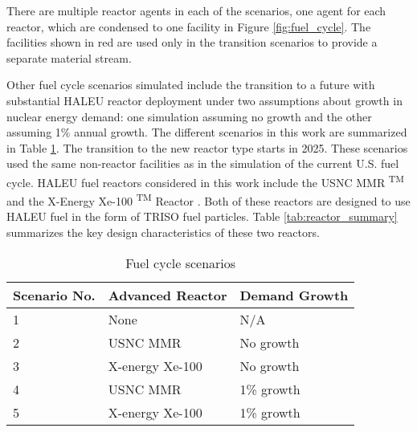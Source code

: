 There are multiple reactor agents in each of the scenarios, one agent for 
each reactor, which are condensed to one facility in Figure 
\ref{fig:fuel_cycle}. The facilities shown in red are used only in the 
transition scenarios to provide a separate material stream. 

Other fuel cycle scenarios simulated include the transition to a future with 
substantial \gls{HALEU} 
reactor deployment under two assumptions about growth in nuclear energy 
demand: one simulation assuming no growth and the other assuming 1\% annual 
growth. The different scenarios in this work are summarized in Table 
\ref{tab:scenarios}.  
The transition to the new reactor type starts in 2025. 
These scenarios used the same  
non-reactor facilities as in the simulation of the current 
U.S. fuel cycle. \gls{HALEU} fuel reactors 
considered in this work include the \gls{USNC} \gls{MMR} \textsuperscript{TM}
\cite{mitchell_usnc_2020} and the X-Energy Xe-100 \textsuperscript{TM} 
Reactor \cite{harlan_x-energy_2018}\cite{hussain_advances_2018}. Both of 
these reactors are designed 
to use \gls{HALEU} fuel in the form of \gls{TRISO} fuel particles. Table 
\ref{tab:reactor_summary} summarizes the key design characteristics of these 
two reactors.

\begin{table}[ht]
    \caption{Fuel cycle scenarios}
    \label{tab:scenarios}
    \begin{tabular}{p{2cm}p{3cm}p{2.5cm}}
        \hline
        Scenario No. & Advanced Reactor & Demand Growth \\\hline
        1 & None & N/A \\
        2 & \gls{USNC} \gls{MMR} & No growth \\
        3 & X-energy Xe-100 & No growth \\
        4 & \gls{USNC} \gls{MMR} & 1\% growth\\
        5 & X-energy Xe-100 & 1\% growth\\
        \hline
    \end{tabular}
\end{table}

